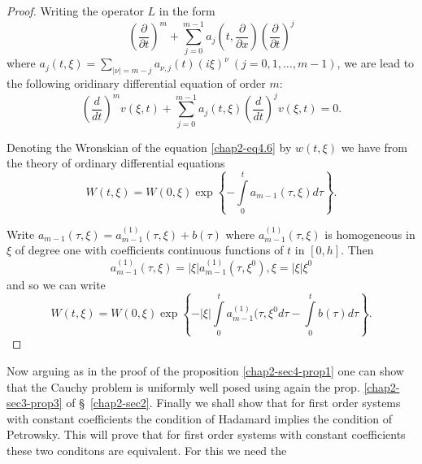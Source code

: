 \begin{proof}
Writing the operator $L$ in the form 
\begin{equation*}
\left(\dfrac{\partial}{\partial t}\right)^m +
\sum\limits^{m-1}_{j=0}a_j
\left(t,  \dfrac{\partial }{\partial x}\right) \left(\dfrac{\partial}{\partial
    t}\right)^j\tag{4.5}\label{chap2-eq4.5}  
\end{equation*}
where $a_j(t, \xi) =\sum\limits_{|\nu|=m-j} a_{\nu, j} (t) (i\xi)^\nu\
(j=0, 1, \ldots, m-1)$, we are lead to the following oridinary
differential equation of order $m$:  
\begin{equation}
 \left( \dfrac{d}{dt}\right)^m v (\xi,  t) + \sum\limits^{m-1}_{j=0} a_j(t, \xi)
  \left(\dfrac{d}{dt}\right)^j v(\xi, t) = 0.\tag{4.6}\label{chap2-eq4.6} 
\end{equation}\pageoriginale

Denoting the Wronskian of the equation \eqref{chap2-eq4.6} by $w(t,
\xi)$ we have 
from the theory of ordinary differential equations 
\begin{equation}
 W(t, \xi) = W(0, \xi ) \exp \left\{-\int\limits^t_0 a_{m-1} (\tau, \xi ) d
 \tau \right\}.  \tag{4.7}\label{chap2-eq4.7} 
 \end{equation} 

Write $a_{m-1}(\tau, \xi) = a^{(1)}_{m-1}(\tau, \xi) + b(\tau)$ where
 $a_{m-1}^{(1)}(\tau, \xi)$ is homogeneous in $\xi$ of degree one
 with coefficients continuous functions of $t$ in $[0, h]$. Then   
 $$
 a_{m-1}^{(1)} (\tau, \xi) = |\xi| a^{(1)}_{m-1} (\tau, \xi^0),  \xi =
 |\xi | \xi^0  
 $$ 
 and so we can write 
 $$
  W(t, \xi) = W(0, \xi) \exp \left\{-|\xi| \int\limits^t_0
  a^{(1)}_{m-1} (\tau, \xi^0 d \tau - \int\limits^t_0 b
  (\tau)d\tau\right\} .
  $$
\end{proof}

Now arguing as in the proof of the
proposition \ref{chap2-sec4-prop1} one can show that  
the Cauchy problem is uniformly well posed using again the
prop. \ref{chap2-sec3-prop3} of 
\S\ \ref{chap2-sec2}. Finally we shall show that for first order
systems with constant 
coefficients the condition of Hadamard implies the condition of
Petrowsky. This will prove that for first order systems with constant
coefficients these two conditons are equivalent. For this we need the  


